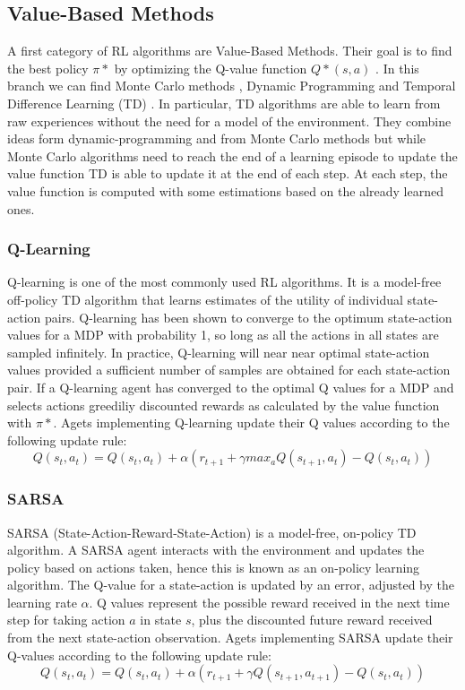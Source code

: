 \subsection{Value-Based Methods}
A first category of RL algorithms are Value-Based Methods. Their goal is to find the best policy $\pi*$ by optimizing the Q-value function $Q*(s,a)$ . In this branch we can find Monte Carlo methods \cite{mc}, Dynamic Programming \cite{dp} and Temporal Difference Learning (TD) \cite{td}.
In particular, TD algorithms are able to learn from raw experiences without the need for a model of the environment. They combine ideas form dynamic-programming and from Monte Carlo methods but while Monte Carlo algorithms need to reach the end of a learning episode to update the value function TD is able to update it at the end of each step.
At each step, the value function is computed with some estimations based on the already learned ones.

\subsubsection{Q-Learning}
Q-learning is one of the most commonly used RL algorithms. It is a model-free off-policy TD algorithm that learns estimates of the utility of individual state-action pairs. Q-learning has been shown to converge to the optimum state-action values for a MDP with probability 1, so long as all the actions in all states are sampled infinitely. In practice, Q-learning will near near optimal state-action values provided a sufficient number of samples are obtained for each state-action pair. If a Q-learning agent has converged to the optimal Q values for a MDP and selects actions greediliy discounted rewards as calculated by the value function with $\pi*$. Agets implementing Q-learning update their Q values according to the following update rule: 
\[Q(s_t,a_t)=Q(s_t,a_t)+\alpha(r_{t+1}+\gamma max_aQ(s_{t+1},a_t)-Q(s_t,a_t))\]

\subsubsection{SARSA}
SARSA (State-Action-Reward-State-Action) is a model-free, on-policy TD algorithm.
A SARSA agent interacts with the environment and updates the policy based on actions taken, hence this is known as an on-policy learning algorithm. The Q-value for a state-action is updated by an error, adjusted by the learning rate $\alpha$. Q values represent the possible reward received in the next time step for taking action $a$ in state $s$, plus the discounted future reward received from the next state-action observation.
Agets implementing SARSA update their Q-values according to the following update rule:
\[Q(s_t,a_t)=Q(s_t,a_t)+\alpha(r_{t+1}+\gamma Q(s_{t+1},a_{t+1})-Q(s_t,a_t))\]





